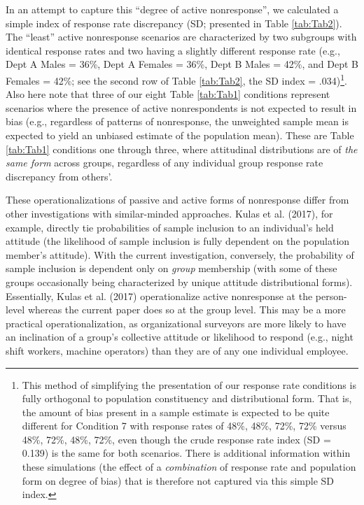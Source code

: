 \documentclass[
  man,floatsintext]{apa7}
\begin{document}
In an attempt to capture this ``degree of active nonresponse'', we calculated a simple index of response rate discrepancy (SD; presented in Table \ref{tab:Tab2}). The ``least'' active nonresponse scenarios are characterized by two subgroups with identical response rates and two having a slightly different response rate (e.g., Dept A Males = 36\%, Dept A Females = 36\%, Dept B Males = 42\%, and Dept B Females = 42\%; see the second row of Table \ref{tab:Tab2}, the SD index = .034)\footnote{This method of simplifying the presentation of our response rate conditions is fully orthogonal to population constituency and distributional form. That is, the amount of bias present in a sample estimate is expected to be quite different for Condition 7 with response rates of 48\%, 48\%, 72\%, 72\% versus 48\%, 72\%, 48\%, 72\%, even though the crude response rate index (SD = 0.139) is the same for both scenarios. There is additional information within these simulations (the effect of a \emph{combination} of response rate and population form on degree of bias) that is therefore not captured via this simple SD index.}. Also here note that three of our eight Table \ref{tab:Tab1} conditions represent scenarios where the presence of active nonrespondents is not expected to result in bias (e.g., regardless of patterns of nonresponse, the unweighted sample mean is expected to yield an unbiased estimate of the population mean). These are Table \ref{tab:Tab1} conditions one through three, where attitudinal distributions are of \emph{the same form} across groups, regardless of any individual group response rate discrepancy from others'.

These operationalizations of passive and active forms of nonresponse differ from other investigations with similar-minded approaches. Kulas et al. (2017), for example, directly tie probabilities of sample inclusion to an individual's held attitude (the likelihood of sample inclusion is fully dependent on the population member's attitude). With the current investigation, conversely, the probability of sample inclusion is dependent only on \emph{group} membership (with some of these groups occasionally being characterized by unique attitude distributional forms). Essentially, Kulas et al. (2017) operationalize active nonresponse at the person-level whereas the current paper does so at the group level. This may be a more practical operationalization, as organizational surveyors are more likely to have an inclination of a group's collective attitude or likelihood to respond (e.g., night shift workers, machine operators) than they are of any one individual employee.
\end{document}
